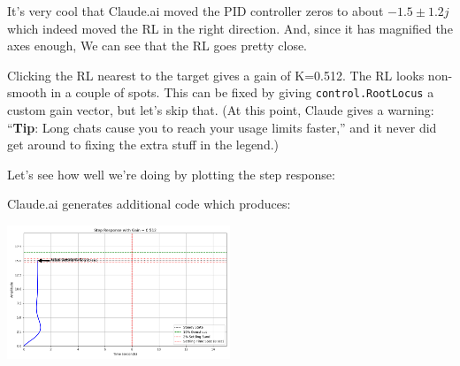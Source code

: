 It's very cool that Claude.ai moved the PID controller zeros to
about $-1.5\pm1.2j$ which indeed moved the RL in the right direction.
And, since it has magnified the axes enough,
We can see that the RL goes pretty close.

Clicking the RL nearest to the target gives a gain of K=0.512.
The RL looks non-smooth in a couple of spots.   This can be fixed
by giving {\tt control.RootLocus} a custom gain vector, but let's skip that.
(At this point, Claude gives a warning: ``{\bf Tip}: Long chats cause you to
reach your usage limits faster,'' and it never did get around to fixing the
extra stuff in the legend.)

Let's see how well we're doing by plotting the step response:



Claude.ai generates additional code which produces:

\includegraphics[width=0.5\textwidth]{figs09/ClaudeRL_stepResp.png}


%



